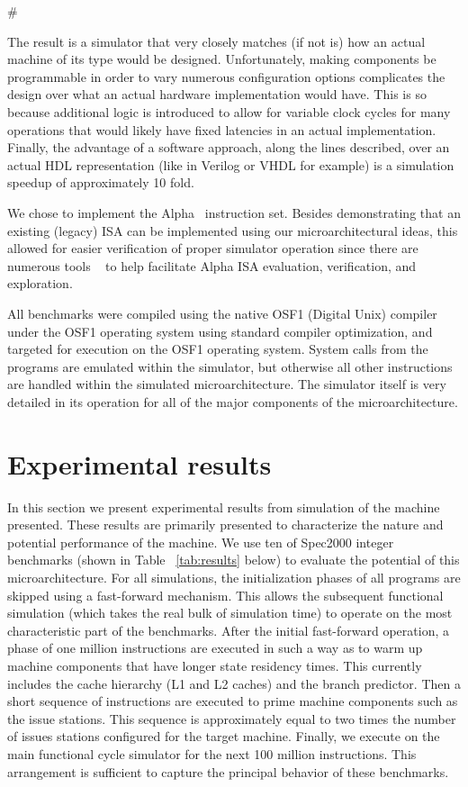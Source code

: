 #\documentclass[10pt,dvips]{article}
\begin{document}
The result is a simulator that very closely matches (if
not is) how
an actual machine of its type would be designed.
Unfortunately, making components be programmable in order to
vary numerous configuration options complicates the design
over what an actual hardware implementation would have.
This is so because additional logic is introduced to allow
for variable clock cycles for many operations that would likely
have fixed latencies in an actual implementation.
Finally, the advantage of a software approach, along the
lines described, over an actual HDL representation (like in Verilog or
VHDL for example) is a simulation speedup of approximately 10 fold.

We chose to implement the Alpha~\cite{Bannon95} instruction set.
Besides demonstrating that an existing (legacy) ISA can be
implemented using our microarchitectural ideas,
this allowed for easier verification of proper
simulator operation since there are numerous 
tools ~\cite{srivastava94b,eustace94c}
to help
facilitate Alpha ISA evaluation, verification, and exploration.

All benchmarks were compiled using the native OSF1 (Digital Unix)
compiler under the OSF1 operating system 
using standard compiler optimization,
and targeted for execution on the OSF1 operating system.
System calls from the programs are emulated within the simulator,
but otherwise all other instructions are handled
within the simulated microarchitecture.
The simulator itself is very detailed in its operation for
all of the major components of the microarchitecture.
%
%
\vspace{-0.15in}
\section{Experimental results}
%
In this section we present experimental results from simulation
of the machine presented.
These results are primarily presented to characterize the
nature and potential performance of the machine.
We use ten of Spec2000 integer benchmarks 
(shown in Table ~\ref{tab:results} below) to evaluate the potential
of this microarchitecture. 
For all simulations, the initialization phases of all
programs are skipped using a fast-forward mechanism.
This allows the subsequent functional simulation (which takes
the real bulk of simulation time) to operate on the most
characteristic part of the benchmarks.
After the initial fast-forward operation, a phase of one million 
instructions are executed in such
a way as to warm up machine components that have longer
state residency times.  This currently includes the cache hierarchy
(L1 and L2 caches) and the branch predictor.
Then a short sequence of instructions are 
executed to prime machine components such as the issue stations.
This sequence is approximately equal to two times the number
of issues stations configured for the target machine.
Finally, we execute on the main functional cycle simulator
for the next 100 million instructions.  
This arrangement is sufficient
to capture the principal behavior of these 
benchmarks.~\cite{sherwood02}
\end{document}

